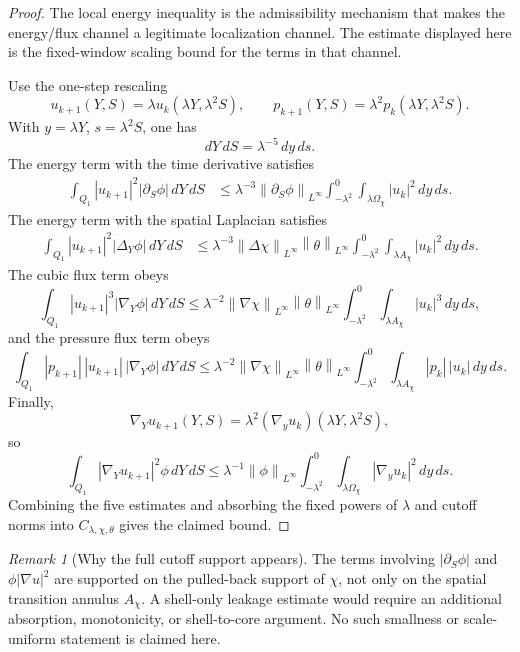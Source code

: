 \documentclass[11pt]{article}
\numberwithin{equation}{section}
\theoremstyle{plain}
\theoremstyle{definition}
\theoremstyle{remark}
\newtheorem{remark}[theorem]{Remark}
\newcommand{\norm}[1]{\left\lVert #1\right\rVert}
\begin{document}
\begin{proof}
The local energy inequality is the admissibility mechanism that makes the
energy/flux channel a legitimate localization channel.  The estimate displayed
here is the fixed-window scaling bound for the terms in that channel.

Use the one-step rescaling
\[
  u_{k+1}(Y,S)=\lambda u_k(\lambda Y,\lambda^2S),
  \qquad
  p_{k+1}(Y,S)=\lambda^2p_k(\lambda Y,\lambda^2S).
\]
With \(y=\lambda Y\), \(s=\lambda^2S\), one has
\[
  dY\,dS=\lambda^{-5}\,dy\,ds.
\]
The energy term with the time derivative satisfies
\[
\begin{aligned}
  \int_{Q_1}|u_{k+1}|^2|\partial_S\phi|\,dY\,dS
  &\le
  \lambda^{-3}\norm{\partial_S\phi}_{L^\infty}
  \int_{-\lambda^2}^{0}\int_{\lambda\Omega_\chi}|u_k|^2\,dy\,ds .
\end{aligned}
\]
The energy term with the spatial Laplacian satisfies
\[
\begin{aligned}
  \int_{Q_1}|u_{k+1}|^2|\Delta_Y\phi|\,dY\,dS
  &\le
  \lambda^{-3}\norm{\Delta\chi}_{L^\infty}\norm{\theta}_{L^\infty}
  \int_{-\lambda^2}^{0}\int_{\lambda A_\chi}|u_k|^2\,dy\,ds .
\end{aligned}
\]
The cubic flux term obeys
\[
  \int_{Q_1}|u_{k+1}|^3|\nabla_Y\phi|\,dY\,dS
  \le
  \lambda^{-2}\norm{\nabla\chi}_{L^\infty}\norm{\theta}_{L^\infty}
  \int_{-\lambda^2}^{0}\int_{\lambda A_\chi}|u_k|^3\,dy\,ds ,
\]
and the pressure flux term obeys
\[
  \int_{Q_1}|p_{k+1}|\,|u_{k+1}|\,|\nabla_Y\phi|\,dY\,dS
  \le
  \lambda^{-2}\norm{\nabla\chi}_{L^\infty}\norm{\theta}_{L^\infty}
  \int_{-\lambda^2}^{0}\int_{\lambda A_\chi}|p_k|\,|u_k|\,dy\,ds .
\]
Finally,
\[
  \nabla_Yu_{k+1}(Y,S)
  =
  \lambda^2(\nabla_yu_k)(\lambda Y,\lambda^2S),
\]
so
\[
  \int_{Q_1}|\nabla_Yu_{k+1}|^2\phi\,dY\,dS
  \le
  \lambda^{-1}\norm{\phi}_{L^\infty}
  \int_{-\lambda^2}^{0}\int_{\lambda\Omega_\chi}|\nabla_yu_k|^2\,dy\,ds .
\]
Combining the five estimates and absorbing the fixed powers of \(\lambda\)
and cutoff norms into \(C_{\lambda,\chi,\theta}\) gives the claimed bound.
\end{proof}

\begin{remark}[Why the full cutoff support appears]
The terms involving \(|\partial_S\phi|\) and \(\phi|\nabla u|^2\) are supported
on the pulled-back support of \(\chi\), not only on the spatial transition
annulus \(A_\chi\).  A shell-only leakage estimate would require an additional
absorption, monotonicity, or shell-to-core argument.  No such smallness or
scale-uniform statement is claimed here.
\end{remark}
\end{document}
